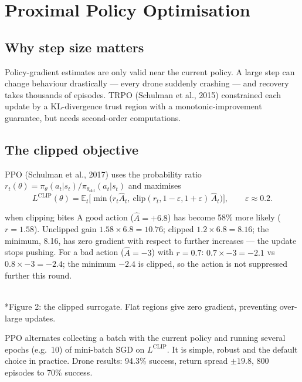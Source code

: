 \documentclass[11pt]{article}
\begin{document}
\section{Proximal Policy Optimisation}
\subsection{Why step size matters}
Policy-gradient estimates are only valid near the current policy. A large step can change behaviour drastically --- every drone suddenly crashing --- and recovery takes thousands of episodes. TRPO (Schulman et al., 2015) constrained each update by a KL-divergence trust region with a monotonic-improvement guarantee, but needs second-order computations.

\subsection{The clipped objective}
PPO (Schulman et al., 2017) uses the probability ratio $r_t(\theta)=\pi_\theta(a_t|s_t)/\pi_{\theta_{\text{old}}}(a_t|s_t)$ and maximises
\[L^{\text{CLIP}}(\theta)=\mathbb E_t\Big[\min\big(r_t\hat A_t,\ \text{clip}(r_t,1-\varepsilon,1+\varepsilon)\,\hat A_t\big)\Big],\qquad\varepsilon\approx0.2.\]
\begin{example}{when clipping bites}
A good action ($\hat A=+6.8$) has become 58\% more likely ($r=1.58$). Unclipped gain $1.58\times6.8=10.76$; clipped $1.2\times6.8=8.16$; the minimum, 8.16, has zero gradient with respect to further increases --- the update stops pushing. For a bad action ($\hat A=-3$) with $r=0.7$: $0.7\times-3=-2.1$ vs $0.8\times-3=-2.4$; the minimum $-2.4$ is clipped, so the action is not suppressed further this round.
\end{example}
\begin{center}\\*{\small\color{GreyN}Figure 2: the clipped surrogate. Flat regions give zero gradient, preventing over-large updates.}\end{center}
PPO alternates collecting a batch with the current policy and running several epochs (e.g.\ 10) of mini-batch SGD on $L^{\text{CLIP}}$. It is simple, robust and the default choice in practice. Drone results: 94.3\% success, return spread $\pm19.8$, 800 episodes to 70\% success.
\end{document}
